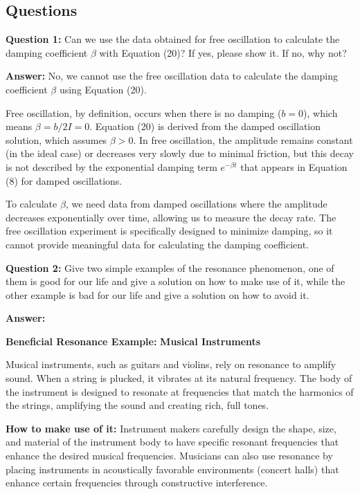 \documentclass[12pt]{article}
\begin{document}
\subsection{Questions}

\textbf{Question 1:} Can we use the data obtained for free oscillation to calculate the damping coefficient $\beta$ with Equation (20)? If yes, please show it. If no, why not?

\textbf{Answer:} No, we cannot use the free oscillation data to calculate the damping coefficient $\beta$ using Equation (20). 

Free oscillation, by definition, occurs when there is no damping ($b = 0$), which means $\beta = b/2I = 0$. Equation (20) is derived from the damped oscillation solution, which assumes $\beta > 0$. In free oscillation, the amplitude remains constant (in the ideal case) or decreases very slowly due to minimal friction, but this decay is not described by the exponential damping term $e^{-\beta t}$ that appears in Equation (8) for damped oscillations.

To calculate $\beta$, we need data from damped oscillations where the amplitude decreases exponentially over time, allowing us to measure the decay rate. The free oscillation experiment is specifically designed to minimize damping, so it cannot provide meaningful data for calculating the damping coefficient.

\textbf{Question 2:} Give two simple examples of the resonance phenomenon, one of them is good for our life and give a solution on how to make use of it, while the other example is bad for our life and give a solution on how to avoid it.

\textbf{Answer:}

\textbf{Beneficial Resonance Example:} \textbf{Musical Instruments}

Musical instruments, such as guitars and violins, rely on resonance to amplify sound. When a string is plucked, it vibrates at its natural frequency. The body of the instrument is designed to resonate at frequencies that match the harmonics of the strings, amplifying the sound and creating rich, full tones.

\textbf{How to make use of it:} Instrument makers carefully design the shape, size, and material of the instrument body to have specific resonant frequencies that enhance the desired musical frequencies. Musicians can also use resonance by placing instruments in acoustically favorable environments (concert halls) that enhance certain frequencies through constructive interference.
\end{document}
